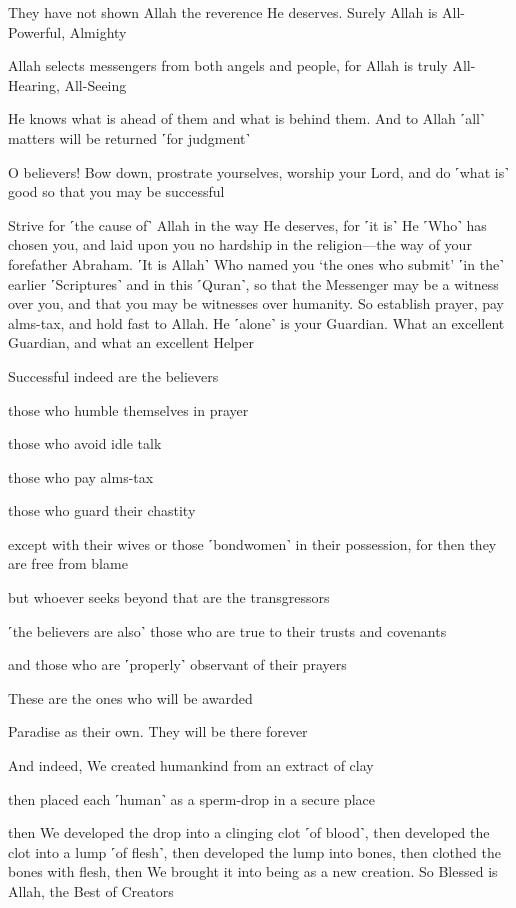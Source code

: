 They have not shown Allah the reverence He deserves. Surely Allah is All-Powerful, Almighty

Allah selects messengers from both angels and people, for Allah is truly All-Hearing, All-Seeing

He knows what is ahead of them and what is behind them. And to Allah ˹all˺ matters will be returned ˹for judgment˺

O believers! Bow down, prostrate yourselves, worship your Lord, and do ˹what is˺ good so that you may be successful

Strive for ˹the cause of˺ Allah in the way He deserves, for ˹it is˺ He ˹Who˺ has chosen you, and laid upon you no hardship in the religion—the way of your forefather Abraham. ˹It is Allah˺ Who named you ‘the ones who submit’ ˹in the˺ earlier ˹Scriptures˺ and in this ˹Quran˺, so that the Messenger may be a witness over you, and that you may be witnesses over humanity. So establish prayer, pay alms-tax, and hold fast to Allah. He ˹alone˺ is your Guardian. What an excellent Guardian, and what an excellent Helper

Successful indeed are the believers

those who humble themselves in prayer

those who avoid idle talk

those who pay alms-tax

those who guard their chastity

except with their wives or those ˹bondwomen˺ in their possession, for then they are free from blame

but whoever seeks beyond that are the transgressors

˹the believers are also˺ those who are true to their trusts and covenants

and those who are ˹properly˺ observant of their prayers

These are the ones who will be awarded

Paradise as their own. They will be there forever

And indeed, We created humankind from an extract of clay

then placed each ˹human˺ as a sperm-drop in a secure place

then We developed the drop into a clinging clot ˹of blood˺, then developed the clot into a lump ˹of flesh˺, then developed the lump into bones, then clothed the bones with flesh, then We brought it into being as a new creation. So Blessed is Allah, the Best of Creators

